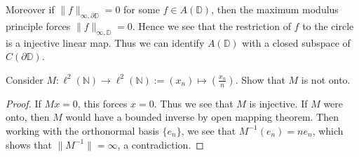 

Moreover if $\|f\|_{\infty, \partial \mathbb{D}} = 0$ for some $f \in
A(\mathbb{D})$, then the maximum modulus principle forces
$\|f\|_{\infty, \mathbb{D}} = 0$. Hence we see that the restriction
of $f$ to the circle is a injective linear map. Thus we can identify
$A(\mathbb{D})$ with a closed subspace of $C(\partial \mathbb{D})$.

\begin{example}
  Consider $M : \ell^{2}(\mathbb{N}) \to \ell^{2}(\mathbb{N}):= (x_n)
  \mapsto (\frac{x_n}{n})$. Show that $M$ is not onto.
\end{example}
\begin{proof}
  If $Mx = 0$, this forces $x = 0$. Thus we see that $M$ is
  injective. If $M$ were onto, then $M$ would have a bounded inverse
  by open mapping theorem. Then working with the orthonormal basis
  $\{ e_n \}$, we see that $M^{-1}(e_n)  = ne_n$, which shows that $
  \|M^{-1}\| = \infty$, a contradiction.
\end{proof}
